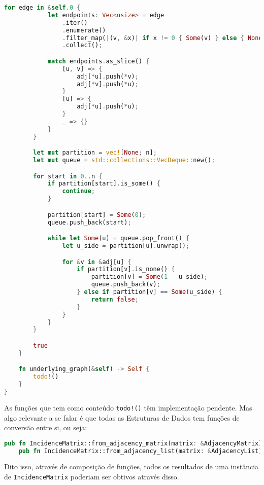 \begin{lstlisting}[language=Rust, caption={Implementação de Graph na Estrutura de Dados Matriz de Incidência}, label=list:impl_inc_mat_g]
        for edge in &self.0 {
            let endpoints: Vec<usize> = edge
                .iter()
                .enumerate()
                .filter_map(|(v, &x)| if x != 0 { Some(v) } else { None })
                .collect();

            match endpoints.as_slice() {
                [u, v] => {
                    adj[*u].push(*v);
                    adj[*v].push(*u);
                }
                [u] => {
                    adj[*u].push(*u);
                }
                _ => {}
            }
        }

        let mut partition = vec![None; n];
        let mut queue = std::collections::VecDeque::new();

        for start in 0..n {
            if partition[start].is_some() {
                continue;
            }

            partition[start] = Some(0);
            queue.push_back(start);

            while let Some(u) = queue.pop_front() {
                let u_side = partition[u].unwrap();

                for &v in &adj[u] {
                    if partition[v].is_none() {
                        partition[v] = Some(1 - u_side);
                        queue.push_back(v);
                    } else if partition[v] == Some(u_side) {
                        return false;
                    }
                }
            }
        }

        true
    }

    fn underlying_graph(&self) -> Self {
        todo!()
    }
}
\end{lstlisting}

As funções que tem como conteúdo \texttt{todo!()} têm implementação pendente. Mas algo relevante a se falar é que todas as Estruturas de Dados tem funções de conversão entre si, ou seja:

\begin{lstlisting}[language=Rust, caption={Funções de Conversão}, label=list:convesion]
    pub fn IncidenceMatrix::from_adjacency_matrix(matrix: &AdjacencyMatrix) -> Self;
    pub fn IncidenceMatrix::from_adjacency_list(matrix: &AdjacencyList) -> Self;
\end{lstlisting}

Dito isso, através de composição de funções, todos os resultados de uma instância de \texttt{IncidenceMatrix} poderiam ser obtivos através disso.
